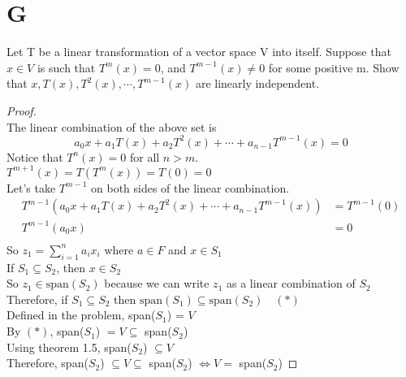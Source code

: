 \documentclass[11pt]{scrartcl}
\begin{document}
\section{G}
Let T be a linear transformation of a vector space V into itself. Suppose that $x \in V$ is such that $T^m (x) = 0$, and
$T^{m-1}(x) \neq 0$ for some positive m. Show that $x,T(x),T^2(x),\cdots ,T^{m-1}(x)$ are linearly independent.
\begin{proof}
	\-\\
	The linear combination of the above set is $$ a_0x + a_1T(x) + a_2T^2(x) + \cdots + a_{n-1}T^{m-1}(x) = 0$$
	Notice that $T^n(x) = 0$ for all $n > m$.\\
	$T^{m+1}(x) = T(T^{m}(x)) = T(0) = 0$\\
	Let's take $T^{m-1}$ on both sides of the linear combination.	
	\begin{align*}
		T^{m-1}(a_0x + a_1T(x) + a_2T^2(x) + \cdots + a_{n-1}T^{m-1}(x)) &= T^{m-1}(0)\\
		T^{m-1}(a_0x)&= 0 \\
	\end{align*}
	So $z_1 = \sum_{i=1}^{n}a_ix_i$ where $a \in F$ and $x \in S_1$\\
	If $S_1 \subseteq S_2$, then $x \in S_2$\\
	So $z_1 \in \text{span}(S_2)$ because we can write $z_1$ as a linear combination of $S_2$\\
	Therefore, if  $S_1 \subseteq S_2$ then $\text{span}(S_1) \subseteq \text{span}(S_2) \quad (*)$\\
	Defined in the problem, span($S_1$) = $V$\\
	By $(*)$, span($S_1$) $= V \subseteq$ span($S_2$)\\
	Using theorem 1.5, span($S_2$) $\subseteq V$\\
	Therefore, span($S_2$) $\subseteq V \subseteq$ span($S_2$) $\Leftrightarrow V = $ span($S_2$)
\end{proof}
\end{document}

